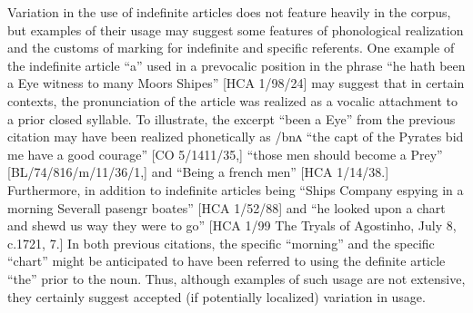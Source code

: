   Variation in the use of indefinite articles does not feature heavily in the corpus, but examples of their usage may suggest some features of phonological realization and the customs of marking for indefinite and specific referents. One example of the indefinite article “a” used in a prevocalic position in the phrase “he hath been a Eye witness to many Moors Shipes” [HCA 1/98/24] may suggest that in certain contexts, the pronunciation of the article was realized as a vocalic attachment to a prior closed syllable. To illustrate, the excerpt “been a Eye” from the previous citation may have been realized phonetically as /bnʌ “the capt of the Pyrates bid me have a good courage” [CO 5/1411/35,] “those men should become a Prey” [BL/74/816/m/11/36/1,] and “Being a french men” [HCA 1/14/38.] Furthermore, in addition to indefinite articles being \textstylepron{permissible for generic abstract referents, they also appear to have been acceptable for specific singular referents (more commonly denoted with the definite article,] e.g.,} “Ships Company espying in a morning Severall pasengr boates” [HCA 1/52/88] and “he looked upon a chart and shewd us way they were to go” [HCA 1/99 The Tryals of Agostinho, July 8, c.1721, 7.] In both previous citations, the specific “morning” and the specific “chart” might be anticipated to have been referred to using the definite article “the” prior to the noun. Thus, although examples of such usage are not extensive, they certainly suggest accepted (if potentially localized) variation in usage. 

